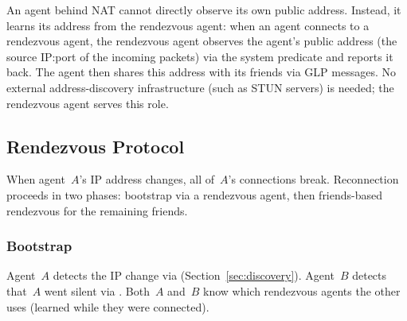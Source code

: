 

An agent behind NAT cannot directly observe its own public address.  Instead, it learns its address from the rendezvous agent: when an agent connects to a rendezvous agent, the rendezvous agent observes the agent's public address (the source IP:port of the incoming packets) via the  system predicate and reports it back.  The agent then shares this address with its friends via GLP messages.  No external address-discovery infrastructure (such as STUN servers) is needed; the rendezvous agent serves this role.

\subsection{Rendezvous Protocol}
\label{sec:rv-protocol}
When agent~$A$'s IP address changes, all of~$A$'s connections break.  Reconnection proceeds in two phases: bootstrap via a rendezvous agent, then friends-based rendezvous for the remaining friends.

\subsubsection{Bootstrap}
\label{sec:bootstrap}

Agent~$A$ detects the IP change via  (Section~\ref{sec:discovery}).  Agent~$B$ detects that~$A$ went silent via .  Both~$A$ and~$B$ know which rendezvous agents the other uses (learned while they were connected).

